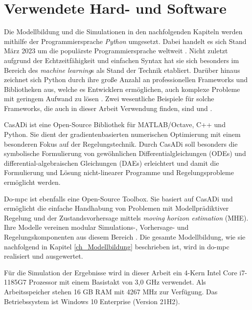 \section{Verwendete Hard- und Software} \label{sec_HardSoftware}
Die Modellbildung und die Simulationen in den nachfolgenden Kapiteln werden mithilfe der Programmiersprache \textit{Python} umgesetzt.
Dabei handelt es sich Stand März 2023 um die populärste Programmiersprache weltweit \cite{Statista}.
Nicht zuletzt aufgrund der Echtzeitfähigkeit \cite[S.9]{Python} und einfachen Syntax hat sie sich besonders im Bereich des \textit{machine learning}s als Stand der Technik etabliert.
Darüber hinaus zeichnet sich Python durch ihre große Anzahl an professionellen Frameworks und Bibliotheken aus, welche es Entwicklern ermöglichen, auch komplexe Probleme mit geringem Aufwand zu lösen \cite[S.3]{Python}.
Zwei wesentliche Beispiele für solche Frameworks, die auch in dieser Arbeit Verwendung finden, sind  und .

CasADi ist eine Open-Source Bibliothek für MATLAB/Octave, C++ und Python.
Sie dient der gradientenbasierten numerischen Optimierung mit einem besonderen Fokus auf der Regelungstechnik.
Durch CasADi soll besonders die symbolische Formulierung von gewöhnlichen Differentialgleichungen (ODEs) und differential-algebraischen Gleichungen (DAEs) erleichtert und damit die Formulierung und Lösung nicht-linearer Programme und Regelungsprobleme ermöglicht werden. \cite{Casadi}

Do-mpc ist ebenfalls eine Open-Source Toolbox.
Sie basiert auf CasADi und ermöglicht die einfache Handhabung von Problemen mit Modellprädiktiver Regelung und der Zustandsvorhersage mittels \textit{moving horizon estimation} (MHE).
Ihre Modelle vereinen modular Simulations-, Vorhersage- und Regelungskomponenten aus diesem Bereich \cite{Dompc2}.
Die gesamte Modellbildung, wie sie nachfolgend in Kapitel \ref{ch_Modellbildung} beschrieben ist, wird in do-mpc realisiert und ausgewertet.

Für die Simulation der Ergebnisse wird in dieser Arbeit ein 4-Kern Intel Core i7-1185G7 Prozessor mit einem Basistakt von 3,0 GHz verwendet.
Als Arbeitsspeicher stehen 16 GB RAM mit 4267 MHz zur Verfügung.
Das Betriebssystem ist Windows 10 Enterprise (Version 21H2).
